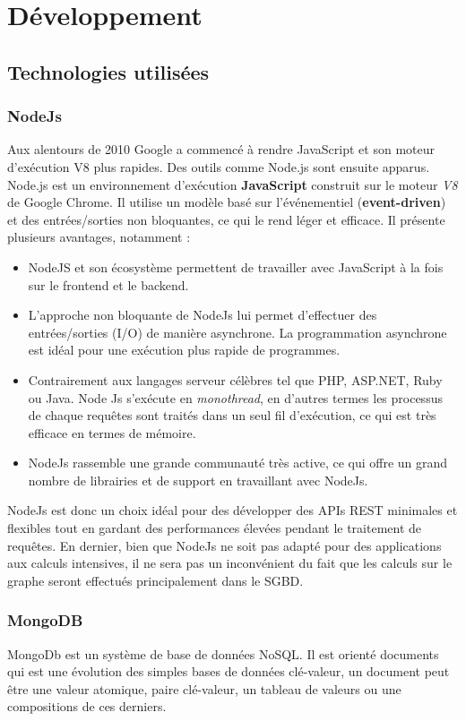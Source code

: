 \chapter{Développement}
\section{Technologies utilisées}
\subsection{NodeJs}
Aux alentours de 2010 Google a commencé à rendre JavaScript et son moteur d'exécution V8 plus rapides. Des outils comme Node.js sont ensuite apparus\cite{NodeJs}.\newline
Node.js est un environnement d'exécution \textbf{JavaScript} construit sur le moteur \emph{V8} de Google Chrome. Il utilise un modèle basé sur l'événementiel (\textbf{event-driven}) et des entrées/sorties non bloquantes, ce qui le rend léger et efficace.
Il présente plusieurs avantages, notamment :
\begin{itemize}
	\item NodeJS et son écosystème permettent de travailler avec JavaScript à la fois sur le frontend et le backend.
	\item L'approche non bloquante de NodeJs lui permet d'effectuer des entrées/sorties (I/O) de manière asynchrone. La programmation asynchrone est idéal pour une exécution plus rapide de programmes.
	\item Contrairement aux langages serveur célèbres tel que PHP, ASP.NET, Ruby ou Java. Node Js s'exécute en \emph{monothread}, en d'autres termes les processus de chaque requêtes sont traités dans un seul fil d'exécution, ce qui est très efficace en termes de mémoire.
	\item NodeJs rassemble une grande communauté très active, ce qui offre un grand nombre de librairies et de support en travaillant avec NodeJs.\newline
\end{itemize}
NodeJs est donc un choix idéal pour des développer des APIs REST minimales et flexibles tout en gardant des performances élevées pendant le traitement de requêtes.\newline
En dernier, bien que NodeJs ne soit pas adapté pour des applications aux calculs intensives, il ne sera pas un inconvénient du fait que les calculs sur le graphe seront effectués principalement dans le SGBD.

\subsection{MongoDB}
	MongoDb est un système de base de données NoSQL. Il est orienté documents qui est une évolution des simples bases de données clé-valeur, un document peut être une valeur atomique, paire clé-valeur, un tableau de valeurs ou une compositions de ces derniers.

